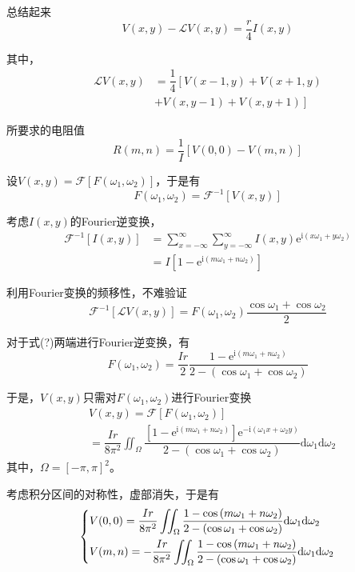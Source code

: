 \documentclass[twocolumn]{article} %
\newcommand{\di}{\mathrm{d}}
\newcommand{\ii}{\mathrm{i}}
\newcommand{\e}[1]{\mathrm{e}^{#1}}
\newcommand{\f}[1]{\mathscr{F}\left[#1\right]}
\newcommand{\fo}[1]{\mathscr{F}^{-1}\left[#1\right]}
\begin{document}
总结起来
\begin{equation}
  V(x,y)-\mathscr{L}V(x,y)=\dfrac{r}{4}I(x,y)
\end{equation}

其中，
\begin{align*}
  \mathscr{L}V(x,y)&=\dfrac{1}{4}\left[V(x-1,y)+V(x+1,y)\right.\\
        &\left.+V(x,y-1)+V(x,y+1)\right]
\end{align*}

所要求的电阻值
\begin{equation}
  R(m,n)=\dfrac{1}{I}\left[V(0,0)-V(m,n)\right]
\end{equation}

设$V(x,y)=\f{F(\omega_1,\omega_2)}$，于是有
\begin{equation}
  F(\omega_1,\omega_2)=\fo{V(x,y)}
\end{equation}

考虑$I(x,y)$的Fourier逆变换，
\begin{align*}
  \fo{I(x,y)}&=\sum_{x=-\infty}^{\infty}\sum_{y=-\infty}^{\infty}I(x,y)\e{\ii(x\omega_1+y\omega_2)}\\
  &=I\left[1-\e{\ii(m\omega_1+n\omega_2)}\right]
\end{align*}

利用Fourier变换的频移性，不难验证
\begin{equation}
  \fo{\mathscr{L}V(x,y)}=F(\omega_1,\omega_2)\dfrac{\cos\omega_1+\cos\omega_2}{2}
\end{equation}

对于式(?)两端进行Fourier逆变换，有
\begin{equation}
  F(\omega_1,\omega_2)=\dfrac{Ir}{2}\dfrac{1-\e{\ii(m\omega_1+n\omega_2)}}{2-(\cos\omega_1+\cos\omega_2)}
\end{equation}

于是，$V(x,y)$只需对$F(\omega_1,\omega_2)$进行Fourier变换
\begin{align*}
  &V(x,y)=\f{F(\omega_1,\omega_2)}\\
  &=\dfrac{Ir}{8\pi^2}\iint_{\Omega}\dfrac{\left[1-\e{\ii(m\omega_1+n\omega_2)}\right]\e{-\ii(\omega_1x+\omega_2y)}}{2-(\cos\omega_1+\cos\omega_2)}\di\omega_1\di\omega_2
\end{align*}
其中，$\Omega=[-\pi,\pi]^2$。

考虑积分区间的对称性，虚部消失，于是有
\begin{align}
  \begin{dcases}
    V(0,0)=\dfrac{Ir}{8\pi^2}\iint_{\Omega}\dfrac{1-\cos{(m\omega_1+n\omega_2)}}{2-(\cos\omega_1+\cos\omega_2)}\di\omega_1\di\omega_2\\
    V(m,n)=-\dfrac{Ir}{8\pi^2}\iint_{\Omega}\dfrac{1-\cos{(m\omega_1+n\omega_2)}}{2-(\cos\omega_1+\cos\omega_2)}\di\omega_1\di\omega_2
  \end{dcases}
\end{align}
\end{document}
